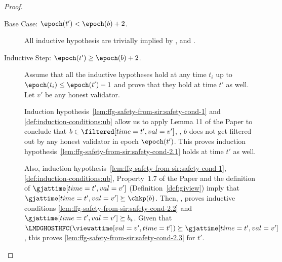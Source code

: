 \documentclass{article}
\begin{document}
\begin{proof}
    \begin{description}
        \item[Base Case: $\epoch(t') < \epoch(b)+2$.]
        All inductive hypothesis are trivially implied by \sirtwo, \sirthree and \sirfive.


        \item[Inductive Step: $\epoch(t') \geq \epoch(b)+2$.]
        Assume that all the inductive hypotheses hold at any time $t_i$ up to %
        $\epoch(t_i) \leq \epoch(t')-1$ and prove that they hold at time $t'$ as well.
        Let $v'$ be any honest validator.


        Induction hypothesis~\ref{lem:ffg-safety-from-sir:safety-cond-1} and \ref{def:induction-conditions:ub} allow us to apply Lemma 11 of the Paper to conclude that $b \in \filtered[time=t',val=v']$, \ie, $b$ does not get filtered out by any honest validator in epoch $\epoch(t')$.
        This proves induction hypothesis~\ref{lem:ffg-safety-from-sir:safety-cond-2.1} holds at time $t'$ as well.

        Also, induction hypothesis~\ref{lem:ffg-safety-from-sir:safety-cond-1},
        \ref{def:induction-conditions:ub},
        Property~1.7 of the Paper
        and the definition of $\gjattime[time=t',val=v']$ (Definition~\ref{def:gjview})
        imply that
        $\gjattime[time=t',val=v'] \succeq \chkp(b)$.
        Then,
        \sirone,
        proves inductive conditions \ref{lem:ffg-safety-from-sir:safety-cond-2.2} and $\gjattime[time=t',val=v']  \succeq b_\mathsf{s}$.
        Given that $\LMDGHOSTHFC(\viewattime[val=v',time=t']) \succeq \gjattime[time=t',val=v']$, this proves \ref{lem:ffg-safety-from-sir:safety-cond-2.3} for $t'$.



\end{description}
\end{proof}
\end{document}
